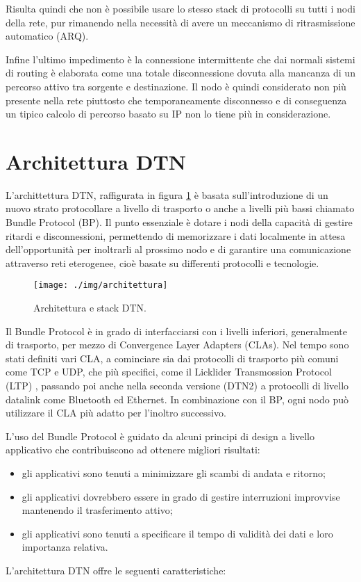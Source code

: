 \documentclass[12pt,a4paper,oneside]{book}
\begin{document}
		Risulta quindi che non è possibile usare lo stesso stack di protocolli su tutti i nodi della rete, pur rimanendo nella necessità di avere un meccanismo di ritrasmissione automatico (ARQ). 

		Infine l'ultimo impedimento è la connessione intermittente che dai normali sistemi di routing è elaborata come una totale disconnessione dovuta alla mancanza di un percorso attivo tra sorgente e destinazione. Il nodo è quindi considerato non più presente nella rete piuttosto che temporaneamente disconnesso e di conseguenza un tipico calcolo di percorso basato su IP non lo tiene più in considerazione.
		
		
		\section{Architettura DTN}		
		
		L'archittettura DTN, raffigurata in figura \ref{fig:architettura} è basata sull'introduzione di un nuovo strato protocollare a livello di trasporto o anche a livelli più bassi chiamato Bundle Protocol (BP). Il punto essenziale è dotare i nodi della capacità di gestire ritardi e disconnessioni, permettendo di memorizzare i dati localmente in attesa dell'opportunità per inoltrarli al prossimo nodo e di garantire una comunicazione attraverso reti eterogenee, cioè basate su differenti protocolli e tecnologie. 
		
		\begin{figure}[h]
			\centering
			\texttt{[image: ./img/architettura]}
			\caption{Architettura e stack DTN.}
			\label{fig:architettura}
		\end{figure}
				
		Il Bundle Protocol è in grado di interfacciarsi con i livelli inferiori, generalmente di trasporto, per mezzo di Convergence Layer Adapters (CLAs). Nel tempo sono stati definiti vari CLA, a cominciare sia dai protocolli di trasporto più comuni come TCP\cite{demmer2014delay} e UDP\cite{kruse2008udp}, che più specifici, come il Licklider Transmossion Protocol (LTP) \cite{ramadas2008rfc}\cite{burleigh2013delay}, passando poi anche nella seconda versione\cite{delay2012dtn2} (DTN2) a protocolli di livello datalink come Bluetooth ed Ethernet. 
		In combinazione con il BP, ogni nodo può utilizzare il CLA più adatto per l'inoltro successivo. 
		
		L'uso del Bundle Protocol è guidato da alcuni principi di design a livello applicativo che contribuiscono ad ottenere migliori risultati:
		\begin{itemize}
			\item gli applicativi sono tenuti a minimizzare gli scambi di andata e ritorno;
			\item gli applicativi dovrebbero essere in grado di gestire interruzioni improvvise mantenendo il trasferimento attivo;
			\item gli applicativi sono tenuti a specificare il tempo di validità dei dati e loro importanza relativa.
		\end{itemize}	
		L'architettura DTN offre le seguenti caratteristiche:
		
\end{document}
